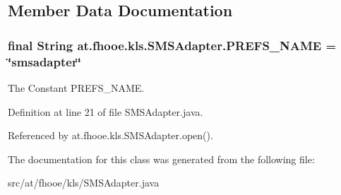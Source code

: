 \subsection{Member Data Documentation}
\hypertarget{classat_1_1fhooe_1_1kls_1_1_s_m_s_adapter_aa6a9f2dc4b03b3fb0e751e31e014040b}{
\subsubsection[{P\-R\-E\-F\-S\-\_\-\-N\-A\-M\-E}]{\setlength{\rightskip}{0pt plus 5cm}final String at.\-fhooe.\-kls.\-S\-M\-S\-Adapter.\-P\-R\-E\-F\-S\-\_\-\-N\-A\-M\-E = \char`\"{}smsadapter\char`\"{}\hspace{0.3cm}{\ttfamily [static]}}}\label{classat_1_1fhooe_1_1kls_1_1_s_m_s_adapter_aa6a9f2dc4b03b3fb0e751e31e014040b}
The Constant P\-R\-E\-F\-S\-\_\-\-N\-A\-M\-E. 

Definition at line 21 of file S\-M\-S\-Adapter.\-java.



Referenced by at.\-fhooe.\-kls.\-S\-M\-S\-Adapter.\-open().



The documentation for this class was generated from the following file\-:\begin{DoxyCompactItemize}
\item 
src/at/fhooe/kls/S\-M\-S\-Adapter.\-java\end{DoxyCompactItemize}
